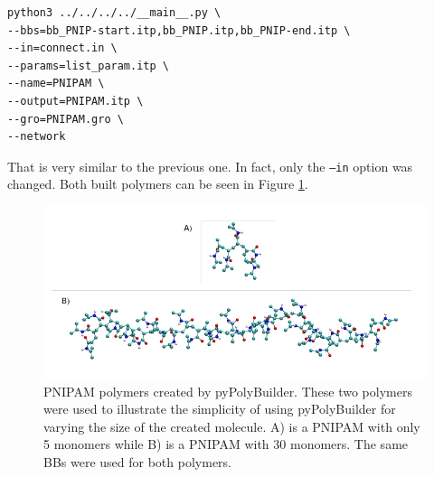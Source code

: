 \begin{lstlisting}
python3 ../../../../__main__.py \
--bbs=bb_PNIP-start.itp,bb_PNIP.itp,bb_PNIP-end.itp \
--in=connect.in \
--params=list_param.itp \
--name=PNIPAM \
--output=PNIPAM.itp \
--gro=PNIPAM.gro \
--network
\end{lstlisting}

That is very similar to the previous one.
In fact, only the \texttt{--in} option was changed.
Both built polymers can be seen in Figure \ref{fig:PNIPAMSIZE}.

\begin{figure}
    \center
    \includegraphics[width=\textwidth]{PNIPAM/PNIPAMSIZE.pdf}
    \caption{PNIPAM polymers created by pyPolyBuilder.
    These two polymers were used to illustrate the simplicity of using pyPolyBuilder for varying the size of the created molecule. A) is a PNIPAM with only 5 monomers while B) is a PNIPAM with 30 monomers.
    The same BBs were used for both polymers.}
    \label{fig:PNIPAMSIZE}
\end{figure}